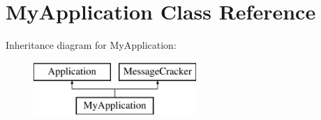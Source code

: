 \hypertarget{classMyApplication}{}\section{My\+Application Class Reference}
\label{classMyApplication}
Inheritance diagram for My\+Application\+:\begin{figure}[H]
\begin{center}
\leavevmode
\includegraphics[height=2.000000cm]{classMyApplication}
\end{center}
\end{figure}
